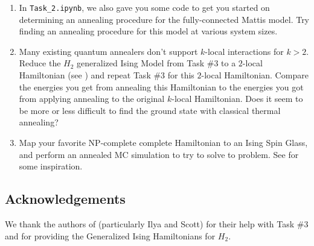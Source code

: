 \documentclass[12pt]{article}
\begin{document}
\begin{enumerate}
    \item In \texttt{Task\_2.ipynb}, we also gave you some code to get you started on determining
          an annealing procedure for the fully-connected Mattis model. Try finding an annealing
          procedure for this model at various system sizes.

    \item Many existing quantum annealers don't support $k$-local interactions for $k > 2$.
          Reduce the $H_2$ generalized Ising Model from Task \#3 to a $2$-local Hamiltonian
          (see \cite{xia2017electronic}) and repeat Task \#3 for this $2$-local Hamiltonian.
          Compare the energies you get from annealing this Hamiltonian to the energies
          you got from applying annealing to the original $k$-local Hamiltonian. Does it seem to
          be more or less difficult to find the ground state with classical thermal annealing?

    \item Map your favorite NP-complete complete Hamiltonian to an Ising Spin Glass, and perform
          an annealed MC simulation to try to solve to problem. See \cite{ising_np} for some
          inspiration.
\end{enumerate}

\subsection*{Acknowledgements}\label{sec:acknowledgements}
We thank the authors of \cite{iqcc} (particularly Ilya and Scott) for their help with Task \#3 and for
providing the Generalized Ising Hamiltonians for $H_2$.

\newpage

\nocite{*}


\end{document}
